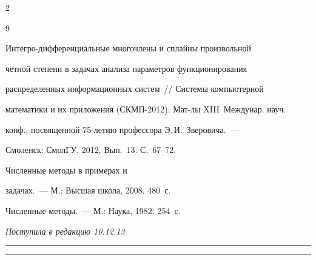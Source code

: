 \begin{multicols}{2}
{{\begin{thebibliography}{9}




Ин\-тегро-диф\-фе\-рен\-ци\-аль\-ные многочлены и сплайны произволь\-ной 


четной степени в задачах анализа па\-ра\-мет\-ров функционирования 


распределенных информационных сис\-тем~// Сис\-те\-мы компьютерной 


математики и их приложения (СКМП-2012): Мат-лы XIII~Междунар. науч. 


конф., посвященной 75-ле\-тию профессора Э.\,И.~Зверовича.~--- 


Смоленск: СмолГУ, 2012. Вып.~13. С.~67--72. 




 Численные методы в примерах и 


задачах.~--- М.: Высшая школа, 2008. 480~с.




 Численные методы.~--- М.: Наука, 1982. 254~с.


\end{thebibliography}


} }





\end{multicols}





\vspace*{-12pt}





\hfill{\small\textit{Поступила в редакцию 10.12.13}}








\vspace*{12pt}





\hrule





\vspace*{2pt}





\hrule








